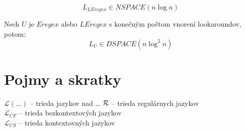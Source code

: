 \documentclass[myposter,portrait,plainboxedsections]{sciposter}
\def\R{{\cal R}} %
\def\L{\mathscr{L}} %
\def\e{Eregex}
\def\le{LEregex}
\def\mysection#1{
{\color{sectionCol}\section*{\sc\bfseries #1}}}
\begin{document}
\begin{multicols*}{3}
$$L_{\le} \in NSPACE(n \log n)$$

Nech $U$ je $\e$ alebo $\le$ s konečným počtom vnorení look\-aroundov, potom:
$$L_{U} \in DSPACE(n\log ^2 n)$$

\mysection{Pojmy a skratky}
$\L(\dots)$ -- trieda jazykov nad \dots
$\R$ -- trieda regulárnych jazykov
\\ $\L_{CF}$ -- trieda bezkontextových jazykov
\\ $\L_{CS}$ -- trieda kontextovných jazykov


\nocite{*}


\end{multicols*}
\end{document}
